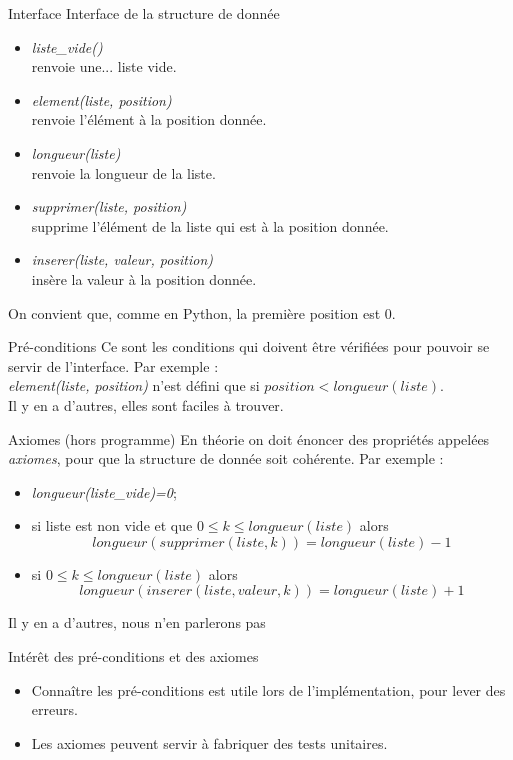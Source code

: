 \documentclass[10pt]{beamer}
\begin{document}
\begin{frame}{Interface}
	Interface de la structure de donnée
	\begin{itemize}
		\item \textit{liste\_vide()}\\ renvoie une... liste vide.
		\item \textit{element(liste, position)}\\ renvoie l'élément à la position donnée.
		\item \textit{longueur(liste)}\\renvoie la longueur de la liste.
		\item \textit{supprimer(liste, position)}\\ supprime l'élément de la liste qui est à la position donnée.
		\item \textit{inserer(liste, valeur, position)}\\ insère la valeur à la position donnée.
	\end{itemize}
	On convient que, comme en Python, la première position est 0.
\end{frame}
\begin{frame}{Pré-conditions}
	Ce sont les conditions qui doivent être vérifiées pour pouvoir se servir de l'interface. Par exemple :\\

	\textit{element(liste, position)} n'est défini que si $position<longueur(liste)$.\\

	Il y en a d'autres, elles sont faciles à trouver.
\end{frame}
\begin{frame}{Axiomes (hors programme)}
	En théorie on doit énoncer des propriétés appelées \textit{axiomes}, pour que la structure de donnée soit cohérente. Par exemple :
	\begin{itemize}
		\item \textit{longueur(liste\_vide)=0};
		\item si liste est non vide et que $0\leqslant k \leqslant longueur(liste)$ alors $$longueur(supprimer(liste, k))=longueur(liste)-1$$
		\item si  $0\leqslant k \leqslant longueur(liste)$ alors $$longueur(inserer(liste, valeur,k))=longueur(liste)+1$$
	\end{itemize}
	Il y en a d'autres, nous n'en parlerons pas
\end{frame}
\begin{frame}{Intérêt des pré-conditions et des axiomes}
	\begin{itemize}
		\item Connaître les pré-conditions est utile lors de l'implémentation, pour \alert{lever des erreurs}.
		\item Les axiomes peuvent servir à fabriquer des tests unitaires.
	\end{itemize}
\end{frame}
\end{document}
